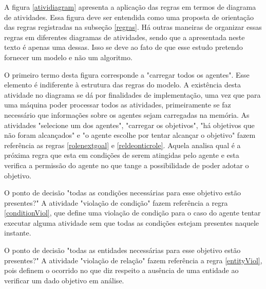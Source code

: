 A figura \ref{atividiagram} apresenta a aplicação das regras em termos de diagrama de atividades. Essa figura deve ser entendida como uma proposta de orientação das regras registradas na subseção \ref{regras}. Há outras maneiras de organizar essas regras em diferentes diagramas de atividades, sendo que a apresentada neste texto é apenas uma dessas. Isso se deve ao fato de que esse estudo pretendo fornecer um modelo e não um algoritmo. 

O primeiro termo desta figura corresponde a "carregar todos os agentes". Esse elemento é indiferente à estrutura das regras do modelo. A existência desta atividade no diagrama se dá por finalidades de implementação, uma vez que para uma máquina poder processar todos as atividades, primeiramente se faz necessário que informações sobre os agentes sejam carregadas na memória. As atividades "selecione um dos agentes", "carregar os objetivos", "há objetivos que não foram alcançados" e "o agente escolhe por tentar alcançar o objetivo" fazem referência as regras \ref{rolenextgoal} e \ref{reldeonticrole}. Aquela analisa qual é a próxima regra que esta em condições de serem atingidas pelo agente e esta verifica a permissão do agente no que tange a possibilidade de poder adotar o objetivo. 

O ponto de decisão "todas as condições necessárias para esse objetivo estão presentes?" A atividade "violação de condição" fazem referência a regra \ref{conditionViol}, que define uma violação de condição para o caso do agente tentar executar alguma atividade sem que todas as condições estejam presentes naquele instante.

O ponto de decisão "todas as entidades necessárias para esse objetivo estão presentes?" A atividade "violação de relação" fazem referência a regra \ref{entityViol}, pois definem o ocorrido no que diz respeito a ausência de uma entidade ao verificar um dado objetivo em análise. 

